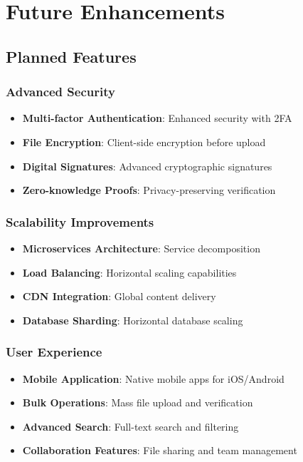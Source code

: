 \documentclass[11pt,a4paper]{article}
\begin{document}
\section{Future Enhancements}

\subsection{Planned Features}

\subsubsection{Advanced Security}
\begin{itemize}
    \item \textbf{Multi-factor Authentication}: Enhanced security with 2FA
    \item \textbf{File Encryption}: Client-side encryption before upload
    \item \textbf{Digital Signatures}: Advanced cryptographic signatures
    \item \textbf{Zero-knowledge Proofs}: Privacy-preserving verification
\end{itemize}

\subsubsection{Scalability Improvements}
\begin{itemize}
    \item \textbf{Microservices Architecture}: Service decomposition
    \item \textbf{Load Balancing}: Horizontal scaling capabilities
    \item \textbf{CDN Integration}: Global content delivery
    \item \textbf{Database Sharding}: Horizontal database scaling
\end{itemize}

\subsubsection{User Experience}
\begin{itemize}
    \item \textbf{Mobile Application}: Native mobile apps for iOS/Android
    \item \textbf{Bulk Operations}: Mass file upload and verification
    \item \textbf{Advanced Search}: Full-text search and filtering
    \item \textbf{Collaboration Features}: File sharing and team management
\end{itemize}
\end{document}

